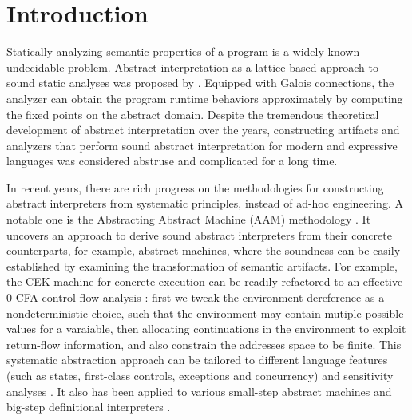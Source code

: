 \section{Introduction} \label{intro}

Statically analyzing semantic properties of a program is a
widely-known undecidable problem. Abstract interpretation as a
lattice-based approach to sound static analyses was proposed
by \citet{DBLP:conf/popl/CousotC77}. Equipped with Galois connections,
the analyzer can obtain the program runtime behaviors approximately
by computing the fixed points on the abstract domain. Despite the tremendous
theoretical development of abstract interpretation over the years,
constructing artifacts and analyzers that perform sound abstract
interpretation for modern and expressive languages was considered
abstruse and complicated for a long time.

In recent years, there are rich progress on the methodologies for
constructing abstract interpreters from systematic principles, instead
of ad-hoc engineering. A notable one is the Abstracting Abstract
Machine (AAM) methodology \cite{DBLP:journals/jfp/HornM12,
  DBLP:conf/icfp/HornM10}. It uncovers an approach to derive sound
abstract interpreters from their concrete counterparts, for example,
abstract machines, where the soundness can be easily established by examining
the transformation of semantic artifacts. For example, the CEK machine
\cite{DBLP:conf/popl/FelleisenF87} for concrete execution can be
readily refactored to an effective $0$-CFA control-flow analysis
\cite{Shivers:1988:CFA:53990.54007, Midtgaard:2012:CAF:2187671.2187672}:
first we tweak the environment dereference as a nondeterministic choice,
such that the environment may contain mutiple possible values for a varaiable,
then allocating continuations in the environment to exploit return-flow information,
and also constrain the addresses space to be finite.
This systematic abstraction approach can be tailored to
different language features (such as states, first-class controls,
exceptions and concurrency) and sensitivity analyses
\cite{DBLP:conf/icfp/Gilray0M16, DBLP:conf/popl/GilrayL0MH16,
  Darais:2015:GTM:2814270.2814308}. It also has been applied to various
small-step abstract machines \cite{DBLP:journals/jfp/HornM12,
  DBLP:conf/icfp/HornM10, Sergey:2013:MAI:2491956.2491979} and
big-step definitional interpreters \cite{Wei:2018:RAA:3243631.3236800,
  DBLP:journals/pacmpl/DaraisLNH17, Keidel:2018:CSP:3243631.3236767}.


